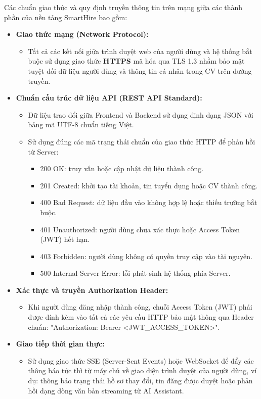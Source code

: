 Các chuẩn giao thức và quy định truyền thông tin trên mạng giữa các thành phần của nền tảng SmartHire bao gồm:

\begin{itemize}
    \item \textbf{Giao thức mạng (Network Protocol):}
    \begin{itemize}
        \item Tất cả các kết nối giữa trình duyệt web của người dùng và hệ thống bắt buộc sử dụng giao thức \textbf{HTTPS} mã hóa qua TLS 1.3 nhằm bảo mật tuyệt đối dữ liệu người dùng và thông tin cá nhân trong CV trên đường truyền.
    \end{itemize}

    \item \textbf{Chuẩn cấu trúc dữ liệu API (REST API Standard):}
    \begin{itemize}
        \item Dữ liệu trao đổi giữa Frontend và Backend sử dụng định dạng JSON với bảng mã UTF-8 chuẩn tiếng Việt.
        \item Sử dụng đúng các mã trạng thái chuẩn của giao thức HTTP để phản hồi từ Server:
        \begin{itemize}
            \item 200 OK: truy vấn hoặc cập nhật dữ liệu thành công.
            \item 201 Created: khởi tạo tài khoản, tin tuyển dụng hoặc CV thành công.
            \item 400 Bad Request: dữ liệu đầu vào không hợp lệ hoặc thiếu trường bắt buộc.
            \item 401 Unauthorized: người dùng chưa xác thực hoặc Access Token (JWT) hết hạn.
            \item 403 Forbidden: người dùng không có quyền truy cập vào tài nguyên.
            \item 500 Internal Server Error: lỗi phát sinh hệ thống phía Server.
        \end{itemize}
    \end{itemize}

    \item \textbf{Xác thực và truyền Authorization Header:}
    \begin{itemize}
        \item Khi người dùng đăng nhập thành công, chuỗi Access Token (JWT) phải được đính kèm vào tất cả các yêu cầu HTTP bảo mật thông qua Header chuẩn: "Authorization: Bearer <JWT\_ACCESS\_TOKEN>".
    \end{itemize}

    \item \textbf{Giao tiếp thời gian thực:}
    \begin{itemize}
        \item Sử dụng giao thức SSE (Server-Sent Events) hoặc WebSocket để đẩy các thông báo tức thì từ máy chủ về giao diện trình duyệt của người dùng, ví dụ: thông báo trạng thái hồ sơ thay đổi, tin đăng được duyệt hoặc phản hồi dạng dòng văn bản streaming từ AI Assistant.
    \end{itemize}
\end{itemize}

